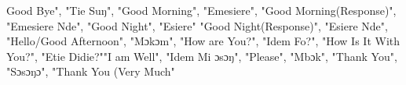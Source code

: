 Good Bye", "Tie Suŋ", "Good Morning", "Emesiere", "Good Morning(Response)", "Emesiere Nde", "Good Night", "Esiere"
 "Good Night(Response)", "Esiere Nde", "Hello/Good Afternoon", "Mɔkɔm", "How are You?", "Idem Fo?", 
 "How Is It With You?", "Etie Didie?""I am Well", "Idem Mi ɔsɔŋ", "Please", "Mbɔk", "Thank You", "Sɔsɔŋɔ", "Thank You (Very Much"